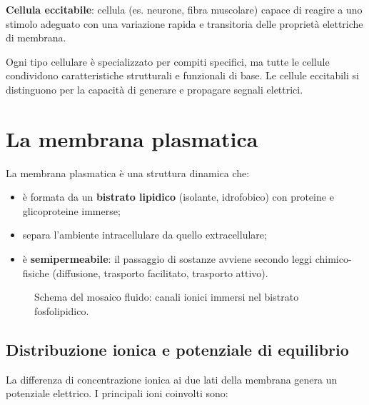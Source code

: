 \documentclass[11pt,a4paper,italian,twoside]{report}
\theoremstyle{definition} %
\begin{document}
\begin{definizione}
\textbf{Cellula eccitabile}: cellula (es. neurone, fibra muscolare) capace di reagire a uno stimolo adeguato con una variazione rapida e transitoria delle proprietà elettriche di membrana.
\end{definizione}

Ogni tipo cellulare è specializzato per compiti specifici, ma tutte le cellule condividono caratteristiche strutturali e funzionali di base. Le cellule eccitabili si distinguono per la capacità di generare e propagare segnali elettrici.

\section{La membrana plasmatica}
\label{sec:membrana}

\begin{concetto}
La membrana plasmatica è una struttura dinamica che:
\begin{itemize}
  \item è formata da un \textbf{bistrato lipidico} (isolante, idrofobico) con proteine e glicoproteine immerse;
  \item separa l'ambiente intracellulare da quello extracellulare;
  \item è \textbf{semipermeabile}: il passaggio di sostanze avviene secondo leggi chimico-fisiche (diffusione, trasporto facilitato, trasporto attivo).
\end{itemize}
\end{concetto}

\begin{figure}[htbp]
  \centering
  \caption{Schema del mosaico fluido: canali ionici immersi nel bistrato fosfolipidico.}
  \label{fig:membrana_canali}
\end{figure}

\subsection{Distribuzione ionica e potenziale di equilibrio}
\label{subsec:distribuzione_ioni}

La differenza di concentrazione ionica ai due lati della membrana genera un potenziale elettrico. I principali ioni coinvolti sono:
\end{document}
